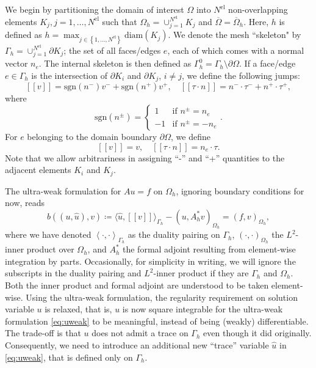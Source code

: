 \documentclass{report}
\newcommand{\eqnlab}[1]{\label{eq:#1}}
\newcommand{\eqnref}[1]{\eqref{eq:#1}}
\newcommand{\LRp}[1]{\left( #1 \right)}
\newcommand{\LRs}[1]{\left[ #1 \right]}
\newcommand{\LRa}[1]{\left\langle #1 \right\rangle}
\newcommand{\LRc}[1]{\left\{ #1 \right\}}
\newcommand{\Nel} {\ensuremath{{N^\text{el}}}}
\newcommand{\jump}[1] {\ensuremath{\LRs{\![#1]\!}}}
\newcommand{\Gh}{\Gamma_h}
\newcommand{\Oh}{\Omega_h}
\begin{document}
We begin by partitioning the domain of interest $\Omega$ into $\Nel$ non-overlapping elements $K_j, j = 1,\hdots,\Nel$ such that $\Oh = \cup_{j=1}^\Nel K_j$ and $\overline{\Omega} = \overline{\Omega}_h$. Here, $h$ is defined as $h= \max_{j\in \LRc{1,\hdots,\Nel}}\text{diam}\LRp{K_j}$.  We denote the mesh ``skeleton" by $\Gh = \cup_{j=1}^\Nel \partial K_j$; the set of all faces/edges $e$, each of which comes with a normal vector ${n}_e$. The internal skeleton is then defined as $\Gamma^0_h = \Gh \setminus \partial \Omega$. If a face/edge $e \in \Gh$ is the intersection of $\partial K_i$ and $\partial K_j$, $i \ne j$, we define the following jumps:
\[
\jump{v} = \text{sgn} \LRp{{n}^-}v^- + \text{sgn} \LRp{{n}^+}v^+, \quad
\jump{\tau \cdot n} = {n}^-\cdot \tau^- + {n}^+\cdot\tau^+,
\]
where
\[
\text{sgn}\LRp{{n}^{\pm}} =
\left\{
\begin{array}{ll}
1 & \text{if } {n}^{\pm} = {n}_e \\
-1 & \text{if } {n}^\pm = -{n}_e
\end{array}
\right..
\]
For $e$ belonging to the domain boundary $\partial \Omega$, we define
\[
\jump{v} = v, \quad
\jump{\tau \cdot n} = {n}_e\cdot \tau.
\]
Note that we allow arbitrariness in assigning ``-'' and ``+'' quantities to the adjacent elements $K_i$ and $K_j$.

The ultra-weak formulation for $Au = f$ on $\Oh$, ignoring boundary
conditions for now, reads
\begin{equation}
\eqnlab{uweak}
b\left(\left(u, \widehat{u}\right),v\right) \coloneqq \langle \widehat{u}, \jump{v}
\rangle_{\Gh} - (u,A_h^*v)_{\Oh}= \LRp{f,v}_{\Oh},
\end{equation}
where we have denoted $\LRa{\cdot,\cdot}_{\Gh}$ as the duality
pairing on $\Gh$, $\LRp{\cdot,\cdot}_{\Oh}$ the $L^2$-inner
product over $\Oh$, and $A_h^*$ the formal adjoint resulting from
element-wise integration by parts.  Occasionally, for simplicity in
writing, we will ignore the subscripts in the duality pairing and
$L^2$-inner product if they are $\Gh$ and $\Oh$. Both the
inner product and formal adjoint are understood to be taken
element-wise. Using the ultra-weak formulation, the regularity
requirement on solution variable $u$ is relaxed, that is, $u$ is now
square integrable for the ultra-weak formulation \eqnref{uweak} to be
meaningful, instead of being (weakly) differentiable.  The trade-off
is that $u$ does not admit a trace on $\Gh$ even though it did
originally. Consequently, we need to introduce an additional new
``trace'' variable $\widehat{u}$ in \eqnref{uweak}, that is defined only on
$\Gh$.
\end{document}
